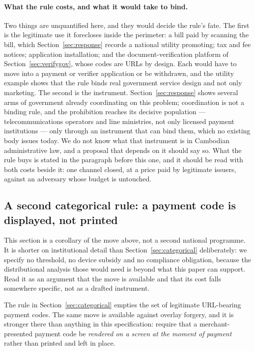 \documentclass[10pt,a4paper,twocolumn]{article}
\begin{document}
\paragraph{What the rule costs, and what it would take to bind.} Two things are
unquantified here, and they would decide the rule's fate. The first is the
legitimate use it forecloses inside the perimeter: a bill paid by scanning the
bill, which Section~\ref{sec:response} records a national utility promoting;
tax and fee notices; application installation; and the document-verification
platform of Section~\ref{sec:verifygov}, whose codes are URLs by design. Each
would have to move into a payment or verifier application or be withdrawn, and
the utility example shows that the rule binds real government service design
and not only marketing. The second is the instrument.
Section~\ref{sec:response} shows several arms of government already
coordinating on this problem; coordination is not a binding rule, and the
prohibition reaches its decisive population --- telecommunications operators
and line ministries, not only licensed payment institutions --- only through an
instrument that can bind them, which no existing body issues today. We do not
know what that instrument is in Cambodian administrative law, and a proposal
that depends on it should say so. What the rule buys is stated in the paragraph
before this one, and it should be read with both costs beside it: one channel
closed, at a price paid by legitimate issuers, against an adversary whose budget
is untouched.

\subsection{A second categorical rule: a payment code is displayed, not printed}
\label{sec:display}

This section is a corollary of the move above, not a second national programme.
It is shorter on institutional detail than Section~\ref{sec:categorical}
deliberately: we specify no threshold, no device subsidy and no compliance
obligation, because the distributional analysis those would need is beyond what
this paper can support. Read it as an argument that the move is available and
that its cost falls somewhere specific, not as a drafted instrument.

The rule in Section~\ref{sec:categorical} empties the set of legitimate
URL-bearing payment codes. The same move is available against overlay forgery,
and it is stronger there than anything in this specification: require that a
merchant-presented payment code be \emph{rendered on a screen at the moment of
payment} rather than printed and left in place.
\end{document}
